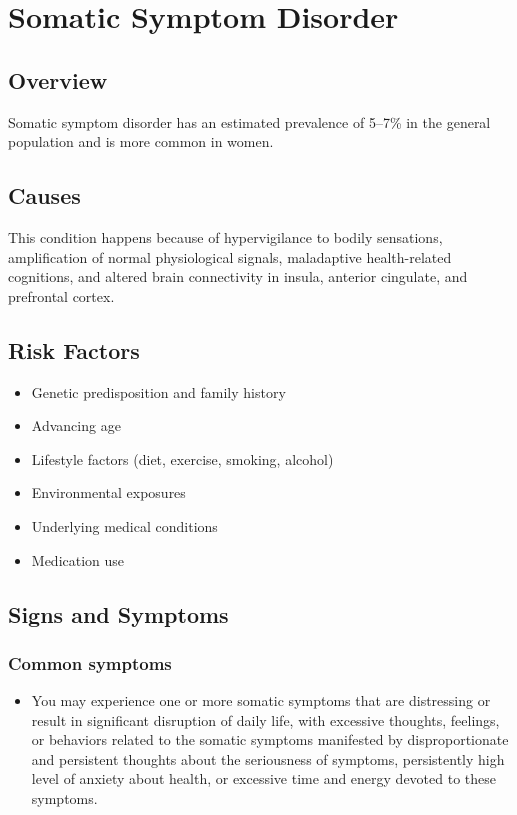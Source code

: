 \chapter{Somatic Symptom Disorder}
\label{sec:Somatic Symptom Disorder}

\section{Overview}
Somatic symptom disorder has an estimated prevalence of 5--7\% in the general population and is more common in women.
\section{Causes}
This condition happens because of hypervigilance to bodily sensations, amplification of normal physiological signals, maladaptive health-related cognitions, and altered brain connectivity in insula, anterior cingulate, and prefrontal cortex.     
\section{Risk Factors}

\begin{itemize}[noitemsep]
  \item Genetic predisposition and family history
  \item Advancing age
  \item Lifestyle factors (diet, exercise, smoking, alcohol)
  \item Environmental exposures
  \item Underlying medical conditions
  \item Medication use
\end{itemize}
\section{Signs and Symptoms}

\subsection{Common symptoms}
\begin{itemize}[noitemsep]
  \item You may experience one or more somatic symptoms that are distressing or result in significant disruption of daily life, with excessive thoughts, feelings, or behaviors related to the somatic symptoms manifested by disproportionate and persistent thoughts about the seriousness of symptoms, persistently high level of anxiety about health, or excessive time and energy devoted to these symptoms. 
  \end{itemize}

